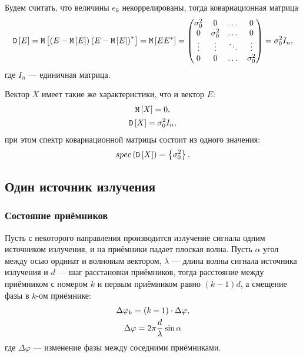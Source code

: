 Будем считать, что величины $e_k$ некоррелированы, тогда ковариационная матрица
\[
    \mathtt{D} \left [ E \right ]
    = \mathtt{M} \left [ \left ( E - \mathtt{M} \left [ E \right ] \right ) \left ( E - \mathtt{M} \left [ E \right ] \right )^* \right ]
    = \mathtt{M} \left [ E E^* \right ]
    = \begin{pmatrix}
          \sigma_0^2 & 0          & \dots  & 0          \\
          0          & \sigma_0^2 & \dots  & 0          \\
          \vdots     & \vdots     & \ddots & \vdots     \\
          0          & 0          & \dots  & \sigma_0^2
    \end{pmatrix}
    = \sigma_0^2 I_n ,
\]
где $I_n$ --- единичная матрица.

Вектор $X$ имеет такие же характеристики, что и вектор $E$:
\begin{gather*}
    \mathtt{M} \left [ X \right ] = 0, \\
    \mathtt{D} \left [ X \right ] = \sigma_0^2 I_n ,
\end{gather*}
при этом спектр ковариационной матрицы состоит из одного значения:
\[
    spec \left ( \mathtt{D} \left [ X \right ] \right ) = \left \{ \sigma_0^2 \right \}.
\]

\subsection{Один источник излучения}

\subsubsection{Состояние приёмников}

Пусть с некоторого направления производится излучение сигнала одним источником излучения, и на приёмники падает плоская волна. Пусть $\alpha$
угол между осью ординат и волновым вектором, $\lambda$ --- длина волны сигнала источника излучения и $d$ --- шаг расстановки приёмников, тогда расстояние между
приёмником с номером $k$ и первым приёмником равно $(k-1) d$, а смещение фазы в $k$-ом приёмнике:
\begin{gather}
    \Delta \varphi_k
    = (k-1) \cdot \Delta \varphi, \notag \\
    \Delta \varphi
    = 2 \pi \frac{d}{\lambda} \sin \alpha
    \label{jammers:single:phase_shift}
\end{gather}
где $\Delta \varphi$ --- изменение фазы между соседними приёмниками.

